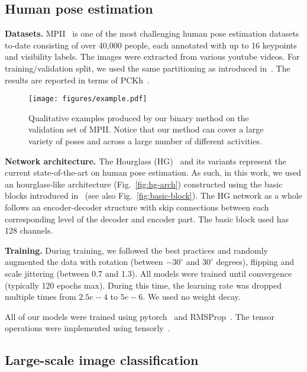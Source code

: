 \documentclass[10pt,twocolumn,letterpaper]{article}
\begin{document}
\subsection{Human pose estimation}

\textbf{Datasets.} MPII~\cite{andriluka20142d} is one of the most challenging human pose estimation datasets to-date consisting of over 40,000 people, each annotated with up to 16 keypoints and visibility labels. The images were extracted from various youtube videos. For training/validation split, we used the same partitioning as introduced in~\cite{tompson2014joint}. The results are reported in terms of PCKh~\cite{andriluka20142d}.


\begin{figure*}
    \centering
    \texttt{[image: figures/example.pdf]}
    \caption{Qualitative examples produced by our binary method on the validation set of MPII. Notice that our method can cover a large variety of poses and across a large number of different activities.}
    \label{fig:examples}
\end{figure*}


\textbf{Network architecture.} The Hourglass (HG)~\cite{newell2016stacked} and its variants represent the current state-of-the-art on human pose estimation. As such, in this work, we used an hourglass-like architecture (Fig.~\ref{fig:hg-arch}) constructed using the basic blocks introduced in~\cite{he2016deep, rastegari2016xnor} (see also Fig.~\ref{fig:basic-block}). The HG network as a whole follows an encoder-decoder structure with skip connections between each corresponding level of the decoder and encoder part. The basic block used has 128 channels.

\noindent\textbf{Training.} During training, we followed the best practices and randomly augmented  the  data  with  rotation  (between  $-30^\circ$ and $30^\circ$ degrees), flipping and scale jittering (between 0.7 and 1.3). All models were trained until convergence (typically 120 epochs max). During this time, the learning rate was dropped multiple times from $2.5e-4$  to $5e-6$. We used no weight decay.

All of our models were trained using pytorch~\cite{paszke2017automatic} and RMSProp~\cite{tieleman2012lecture}. The tensor operations were implemented using tensorly~\cite{kossaifi2016tensorly}.

\subsection{Large-scale image classification}
\end{document}
